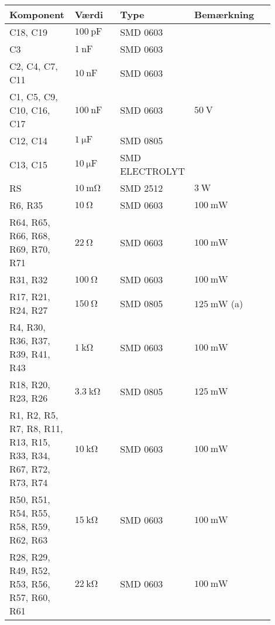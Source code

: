 \begin{table}[h!]
\small
\label{tab:stykliste_diskret}
\begin{threeparttable}
\begin{tabular}{p{0.25\linewidth}p{0.2\linewidth}p{0.25\linewidth}p{0.15\linewidth}p{0.05\linewidth}}
\toprule
\multicolumn{1}{l}{\textbf{Komponent}}  &
\multicolumn{1}{l}{\textbf{Værdi}}      &
\multicolumn{1}{l}{\textbf{Type}}       &
\multicolumn{1}{l}{\textbf{Bemærkning}} &  \\ 
\hline
C18, C19                  & $\SI{100}{\pico\farad}$ & SMD 0603       &   \\
C3                        & $\SI{1}{\nano\farad}$   & SMD 0603       &   \\
C2, C4, C7, C11           & $\SI{10}{\nano\farad}$  & SMD 0603       &   \\
C1, C5, C9, C10, C16, C17 & $\SI{100}{\nano\farad}$ & SMD 0603       & $\SI{50}{\volt}$  \\
C12, C14                  & $\SI{1}{\micro\farad}$  & SMD 0805       &   \\
C13, C15                          & $\SI{10}{\micro\farad}$ & SMD ELECTROLYT &   \\
\midrule
RS                                & $\SI{10}{\milli\ohm}$ & SMD 2512 &  $\SI{3}{\watt}$    \\
R6, R35                           & $\SI{10}{\ohm}$  & SMD 0603 & $\SI{100}{\milli\watt}$  \\
R64, R65, R66, R68, R69, R70, R71 & $\SI{22}{\ohm}$  & SMD 0603 &  $\SI{100}{\milli\watt}$ \\
R31, R32                          & $\SI{100}{\ohm}$ & SMD 0603 & $\SI{100}{\milli\watt}$  \\
R17, R21, R24, R27                & $\SI{150}{\ohm}$ & SMD 0805 & $\SI{125}{\milli\watt}$ (a) \\
R4, R30, R36, R37, R39, R41, R43  & $\SI{1}{\kilo\ohm}$ & SMD 0603 & $\SI{100}{\milli\watt}$  \\
R18, R20, R23, R26 & $\SI{3.3}{\kilo\ohm}$ & SMD 0805 & $\SI{125}{\milli\watt}$  \\
R1, R2, R5, R7, R8, R11, R13, R15, R33, R34, R67, R72, R73, R74 & $\SI{10}{\kilo\ohm}$ & SMD 0603 & $\SI{100}{\milli\watt}$  \\
R50, R51, R54, R55, R58, R59, R62, R63 & $\SI{15}{\kilo\ohm}$ & SMD 0603 & $\SI{100}{\milli\watt}$  \\
R28, R29, R49, R52, R53, R56, R57, R60, R61 & $\SI{22}{\kilo\ohm}$ & SMD 0603 & $\SI{100}{\milli\watt}$  \\

\end{tabular}
\end{threeparttable}
\end{table}

